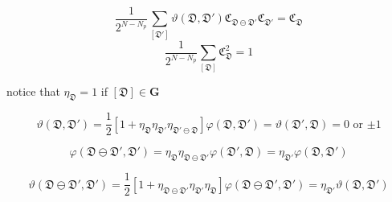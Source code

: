 \documentclass[12font]{article}
\numberwithin{equation}{section}    %
\theoremstyle{definition}
\newcommand{\lrm}[1]{\left[  #1  \right]}
\newcommand{\bo}[1]{\mathbf{#1}}
\begin{document}
\begin{equation}\label{eq:strong-condition}
    \frac{1}{2^{N-N_p}}
    \sum_{[\mathfrak{D}']}
    \vartheta(\mathfrak{D},\mathfrak{D}')
    \mathfrak{C}_{\mathfrak{D}\ominus\mathfrak{D}'}
    \mathfrak{C}_{\mathfrak{D}'}
    =
    \mathfrak{C}_{\mathfrak{D}}
\end{equation}
\begin{equation}\label{eq:weak-condition}
    \frac{1}{2^{N-N_p}}
    \sum_{[\mathfrak{D}]}
    \mathfrak{C}_{\mathfrak{D}}^2
    =
    1
\end{equation}

notice that $\eta_{\mathfrak{D}}=1$ if $[\mathfrak{D}]\in \bo{G}$

\[
    \vartheta(\mathfrak{D},\mathfrak{D}') 
    = 
    \frac{1}{2}
    \lrm{
    1
    +
    \eta_{\mathfrak{D}}
    \eta_{\mathfrak{D}'}
    \eta_{\mathfrak{D}'\ominus\mathfrak{D}}
    }\varphi(\mathfrak{D},\mathfrak{D}')
    =
    \vartheta(\mathfrak{D}',\mathfrak{D})
    =
    \text{$0$ or $\pm 1$}
\]

\[
\varphi(\mathfrak{D}\ominus\mathfrak{D}',\mathfrak{D}') = \eta_{\mathfrak{D}}\eta_{\mathfrak{D}\ominus\mathfrak{D}'} \varphi(\mathfrak{D}',\mathfrak{D})
=
\eta_{\mathfrak{D}'} \varphi(\mathfrak{D},\mathfrak{D}')
\]

\[
\vartheta(\mathfrak{D}\ominus\mathfrak{D}',\mathfrak{D}')
=
\frac{1}{2}
\lrm{
    1
    +
    \eta_{\mathfrak{D}\ominus\mathfrak{D}'}
    \eta_{\mathfrak{D}'}
    \eta_{\mathfrak{D}}
}
\varphi(\mathfrak{D}\ominus\mathfrak{D}',\mathfrak{D}') 
= 
\eta_{\mathfrak{D}'}
\vartheta(\mathfrak{D},\mathfrak{D}')
\]
\end{document}
